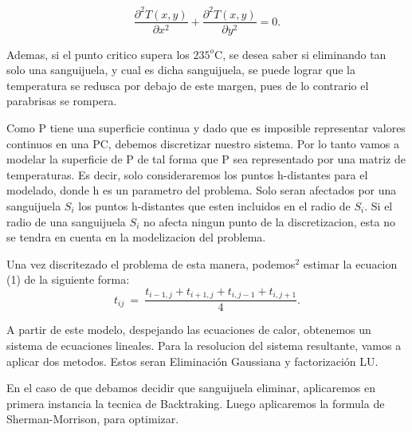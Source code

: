 \begin{equation}\label{eq:calor}
\frac{\partial^2T(x,y)}{\partial x^{2}}+\frac{\partial^2 T(x,y)}{\partial y^{2}} = 0.
\end{equation}

Ademas, si el punto critico supera los $235^o $C, se desea saber si eliminando tan solo una sanguijuela, y cual es dicha sanguijuela,
se puede lograr que la 
temperatura se redusca por debajo de este margen, pues de lo contrario el parabrisas se rompera.

Como P tiene una superficie continua y dado que es imposible representar valores continuos en una PC,
debemos discretizar nuestro sistema. Por lo tanto vamos a modelar la superficie de P de tal forma que P sea representado por una matriz de
temperaturas. Es decir, solo consideraremos los puntos h-distantes para el modelado, donde h es un parametro del problema. 
Solo seran afectados por una sanguijuela $S_i$ los puntos h-distantes que esten incluidos en el radio de $S_i$. Si el radio de una sanguijuela $S_i$ no 
afecta ningun punto de la discretizacion, esta no se tendra en cuenta en la modelizacion del problema. 

Una vez discritezado el problema de esta manera, podemos$^2$ estimar la ecuacion (1) de la siguiente forma:
\begin{equation}
t_{ij} \ =\ \frac{ t_{i-1,j} + t_{i+1,j} + t_{i,j-1} + t_{i,j+1}}{4}.\label{eq:calordd}
\end{equation}



A partir de este modelo, despejando las ecuaciones de calor, obtenemos un sistema de ecuaciones lineales.
Para la resolucion del sistema resultante, vamos a aplicar dos metodos. Estos seran Eliminaci\'on Gaussiana y factorizaci\'on LU.

En el caso de que debamos decidir que sanguijuela eliminar, aplicaremos en primera instancia la tecnica de Backtraking. Luego aplicaremos
la formula de Sherman-Morrison, para optimizar. 


